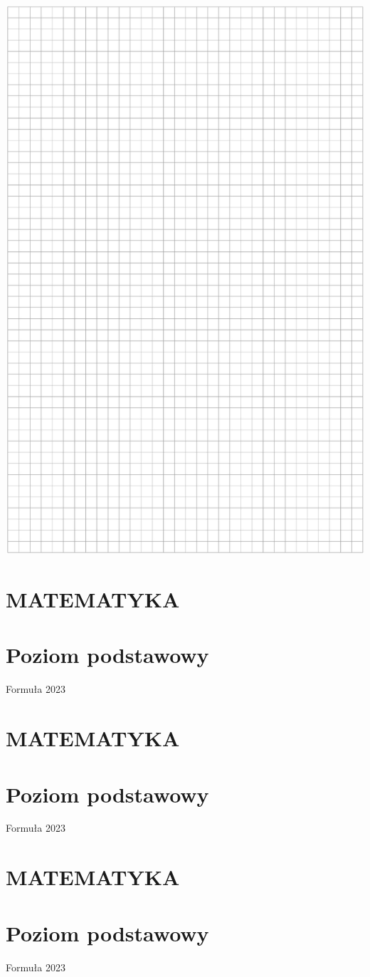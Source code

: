 \documentclass[10pt]{article}
\begin{document}
\includegraphics[max width=\textwidth, center]{2024_11_21_daeb5e5efb43dd4cb535g-30}

\section*{MATEMATYKA}
\section*{Poziom podstawowy}
Formuła 2023

\section*{MATEMATYKA}
\section*{Poziom podstawowy}
Formuła 2023

\section*{MATEMATYKA}
\section*{Poziom podstawowy}
Formuła 2023
\end{document}
